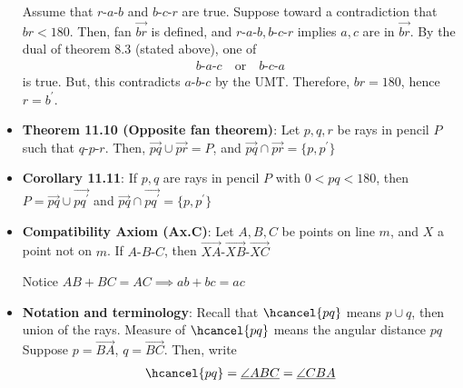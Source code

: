 \documentclass{report}
\begin{document}
\begin{itemize}
                    \bigbreak \noindent 
                    Assume that $ r\text{-}a\text{-}b$ and $ b\text{-}c\text{-}r$ are true. Suppose toward a contradiction that $br < 180$. Then, fan $\overrightarrow{br}$ is defined, and $ r\text{-}a\text{-}b, b\text{-}c\text{-}r$ implies $a,c$ are in $ \overrightarrow{br}$. By the dual of theorem 8.3 (stated above), one of 
                    \begin{align*}
                        b\text{-}a\text{-}c \quad \text{or} \quad b\text{-}c\text{-}a
                    \end{align*}
                    is true. But, this contradicts $ a\text{-}b\text{-}c$ by the UMT. 
                    \bigbreak \noindent 
                    Therefore, $br = 180$, hence $ r = b^{\prime}$. \endpf

                \item \textbf{Theorem 11.10 (Opposite fan theorem)}: Let $p,q,r$ be rays in pencil $P$ such that $ q\text{-}p\text{-}r$. Then, $ \overrightarrow{pq} \cup \overrightarrow{pr} = P$, and $ \overrightarrow{pq} \cap \overrightarrow{pr} = \{p,p^{\prime}\} $
                \item \textbf{Corollary 11.11}: If $p,q$ are rays in pencil $P$ with $0 < pq < 180$, then $P = \overrightarrow{pq} \cup \overrightarrow{pq^{\prime}} $ and $\overrightarrow{pq} \cap \overrightarrow{pq^{\prime}} = \{p,p^{\prime}\}$
                \item \textbf{Compatibility Axiom (Ax.C)}: Let $A,B,C$ be points on line $m$, and $X$ a point not on $m$. If $ A\text{-}B\text{-}C$, then $ \overrightarrow{XA}\text{-}\overrightarrow{XB}\text{-}\overrightarrow{XC} $
                    \bigbreak \noindent 
                    \begin{figure}[ht]
                        \centering
                        \label{fig:compat}
                    \end{figure}
                    \bigbreak \noindent 
                    Notice $AB + BC = AC \implies ab + bc = ac $
                \item \textbf{Notation and terminology}: Recall that $\hcancel{pq}$ means $p \cup q$, then union of the rays. Measure of $\hcancel{pq} $ means the angular distance $pq$
                \bigbreak \noindent 
                Suppose $p = \overrightarrow{BA}$, $ q = \overrightarrow{BC}$. Then, write
                \begin{align*}
                    \hcancel{pq} = \underline{\angle ABC} = \underline{\angle CBA}

\end{align*}
\end{itemize}
\end{document}
